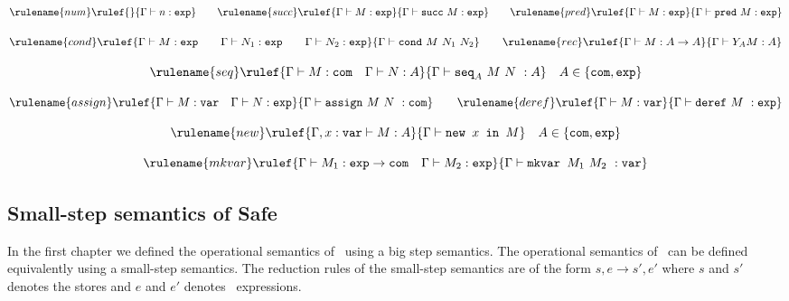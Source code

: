 $$ \rulename{num} \rulef{}{\Gamma \vdash n :\texttt{exp}}
\qquad \rulename{succ} \rulef{\Gamma \vdash M:\texttt{exp} }{\Gamma
\vdash \texttt{succ}\ M:\texttt{exp}} \qquad \rulename{pred}
\rulef{\Gamma \vdash M:\texttt{exp} }{\Gamma \vdash \texttt{pred}\
M:\texttt{exp}}$$

$$
\rulename{cond} \rulef{\Gamma \vdash M : \texttt{exp} \qquad \Gamma
\vdash N_1 : \texttt{exp} \qquad \Gamma \vdash N_2 : \texttt{exp}
}{\Gamma \vdash \texttt{cond}\ M\ N_1\ N_2} \qquad  \rulename{rec}
\rulef{\Gamma \vdash M : A\rightarrow A }{ \Gamma \vdash Y_A M :
A}$$

$$ \rulename{seq} \rulef{\Gamma \vdash M : \texttt{com} \quad \Gamma \vdash N :A}
    {\Gamma \vdash \texttt{seq}_A \ M\ N\ : A} \quad A \in \{ \texttt{com}, \texttt{exp}\}$$

$$ \rulename{assign} \rulef{\Gamma \vdash M : \texttt{var} \quad \Gamma \vdash N : \texttt{exp}}
    {\Gamma \vdash \texttt{assign}\ M\ N\ : \texttt{com}}
\qquad
 \rulename{deref} \rulef{\Gamma \vdash M : \texttt{var}}
    {\Gamma \vdash \texttt{deref}\ M\ : \texttt{exp}}$$

$$ \rulename{new} \rulef{\Gamma, x : \texttt{var} \vdash M : A}
    {\Gamma \vdash \texttt{new } x \texttt{ in } M} \quad A \in \{ \texttt{com}, \texttt{exp}\}$$

$$ \rulename{mkvar} \rulef{\Gamma \vdash M_1 : \texttt{exp} \rightarrow \texttt{com} \quad \Gamma \vdash M_2 : \texttt{exp}}
    {\Gamma \vdash \texttt{mkvar } M_1\ M_2\ : \texttt{var}}$$

\subsection{Small-step semantics of Safe \ialgol}
In the first chapter we defined the operational semantics of
\ialgol\ using a big step semantics. The operational semantics of
\ialgol\ can be defined equivalently using a small-step semantics.
The reduction rules of the small-step semantics are of the form $s,e
\rightarrow s',e'$ where $s$ and $s'$ denotes the stores and $e$ and
$e'$ denotes \ialgol\ expressions.

